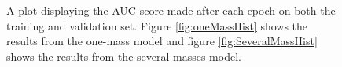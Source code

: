 \begin{figure}
    \caption{A plot displaying the \ac{AUC} score made after each epoch on both the training and validation set. 
    Figure \ref{fig:oneMassHist} shows the results from the one-mass model and figure \ref{fig:SeveralMassHist} shows
    the results from the several-masses model.}
    \label{fig:InterpolateHistory}
\end{figure}
